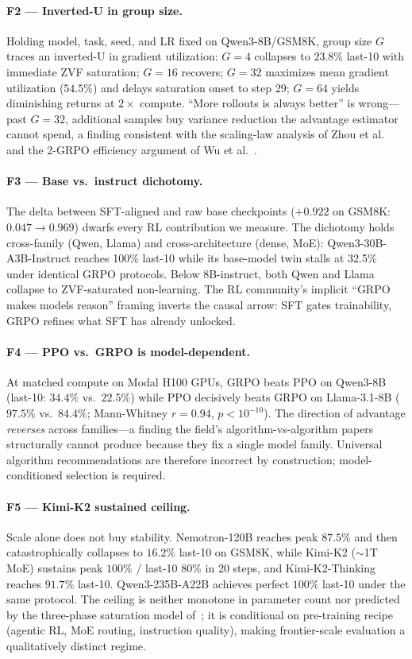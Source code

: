 \paragraph{F2 --- Inverted-U in group size.}
Holding model, task, seed, and LR fixed on Qwen3-8B/GSM8K, group size $G$
traces an inverted-U in gradient utilization: $G{=}4$ collapses to $23.8\%$
last-10 with immediate ZVF saturation; $G{=}16$ recovers; $G{=}32$ maximizes
mean gradient utilization ($54.5\%$) and delays saturation onset to step 29;
$G{=}64$ yields diminishing returns at $2\times$ compute.  ``More rollouts is
always better'' is wrong---past $G{=}32$, additional samples buy variance
reduction the advantage estimator cannot spend, a finding consistent with the
scaling-law analysis of Zhou et al.~\citep{zhou2026demystify} and the
2-GRPO efficiency argument of Wu et al.~\citep{wu2025grpo_dpo}.

\paragraph{F3 --- Base vs.\ instruct dichotomy.}
The delta between SFT-aligned and raw base checkpoints ($+0.922$ on GSM8K:
$0.047 \to 0.969$) dwarfs every RL contribution we measure.  The dichotomy
holds cross-family (Qwen, Llama) and cross-architecture (dense, MoE):
Qwen3-30B-A3B-Instruct reaches 100\% last-10 while its base-model twin stalls
at 32.5\% under identical GRPO protocols.  Below 8B-instruct, both Qwen and
Llama collapse to ZVF-saturated non-learning.  The RL community's implicit
``GRPO makes models reason'' framing inverts the causal arrow: SFT gates
trainability, GRPO refines what SFT has already unlocked.

\paragraph{F4 --- PPO vs.\ GRPO is model-dependent.}
At matched compute on Modal H100 GPUs, GRPO beats PPO on Qwen3-8B (last-10:
$34.4\%$ vs.\ $22.5\%$) while PPO decisively beats GRPO on Llama-3.1-8B
($97.5\%$ vs.\ $84.4\%$; Mann-Whitney $r{=}0.94$, $p{<}10^{-10}$).  The
direction of advantage \emph{reverses} across families---a finding the field's
algorithm-vs-algorithm papers structurally cannot produce because they fix a
single model family.  Universal algorithm recommendations are therefore
incorrect by construction; model-conditioned selection is required.

\paragraph{F5 --- Kimi-K2 sustained ceiling.}
Scale alone does not buy stability.  Nemotron-120B reaches peak $87.5\%$ and
then catastrophically collapses to $16.2\%$ last-10 on GSM8K, while
Kimi-K2 ($\sim$1T MoE) sustains peak $100\%$ /
last-10 $80\%$ in 20 steps, and Kimi-K2-Thinking reaches $91.7\%$ last-10.
Qwen3-235B-A22B achieves perfect $100\%$ last-10 under the same protocol.
The ceiling is neither monotone in parameter count nor predicted by the
three-phase saturation model of~\citet{nimmaturi2025scalinglaws}; it is
conditional on pre-training recipe (agentic RL, MoE routing, instruction
quality), making frontier-scale evaluation a qualitatively distinct regime.

